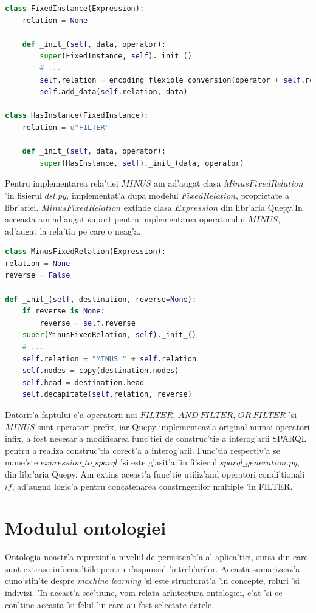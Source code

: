 \documentclass[12pt,a4paper,twoside]{report}
\begin{document}
\begin{lstlisting}[basicstyle=\footnotesize, language = Python]
class FixedInstance(Expression):
    relation = None

    def _init_(self, data, operator):
        super(FixedInstance, self)._init_()
        # ...
        self.relation = encoding_flexible_conversion(operator + self.relation)
        self.add_data(self.relation, data)
        
class HasInstance(FixedInstance):
    relation = u"FILTER"

    def _init_(self, data, operator):
        super(HasInstance, self)._init_(data, operator)

\end{lstlisting}

Pentru implementarea rela'tiei $MINUS$ am ad'augat clasa $MinusFixedRelation$ 'in fisierul $dsl.py$, implementat'a dupa modelul $FixedRelation$, proprietate a libr'ariei. $MinusFixedRelation$ extinde clasa $Expression$ din libr'aria Quepy.'In acceasta am ad'augat suport pentru implementarea operatorului $MINUS$, ad'augat la rela'tia pe care o neag'a. 

\begin{lstlisting}[basicstyle=\footnotesize, language = Python]
class MinusFixedRelation(Expression):
relation = None
reverse = False

def _init_(self, destination, reverse=None):
    if reverse is None:
        reverse = self.reverse
    super(MinusFixedRelation, self)._init_()
    # ...
    self.relation = "MINUS " + self.relation
    self.nodes = copy(destination.nodes)
    self.head = destination.head
    self.decapitate(self.relation, reverse)

\end{lstlisting}

Datorit'a faptului c'a operatorii noi $FILTER$, $AND\ FILTER$, $OR\ FILTER$ 'si $MINUS$ sunt operatori prefix, iar Quepy implementeaz'a original numai operatori infix, a fost necesar'a modificarea func'tiei de construc'tie a interog'arii SPARQL pentru a realiza construc'tia corect'a a interog'arii. Func'tia respectiv'a se nume'ste $expression\_to\_sparql$ 'si este g'asit'a 'in fi'sierul $sparql\_generation.py$, din libr'aria Quepy. Am extins aceast'a func'tie utiliz'and operatori condi'tionali $if$, ad'aug\ia nd logic'a pentru concatenarea constr\ia ngerilor multiple 'in FILTER.

\section{Modulul ontologiei}
Ontologia noastr'a reprezint'a nivelul de persisten't'a al aplica'tiei, sursa din care sunt extrase informa'tiile pentru r'aspunsul 'intreb'arilor. Aceasta sumarizeaz'a cuno'stin'te despre {\it machine learning} 'si este structurat'a 'in concepte, roluri 'si indivizi. 'In aceast'a sec'tiune, vom relata arhitectura ontologiei, c'at 'si ce con'tine aceasta 'si felul 'in care au fost selectate datele. 
\end{document}
